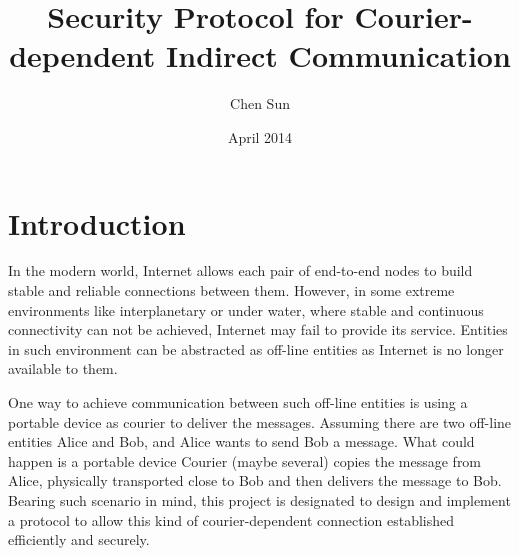 \documentclass[11pt,a4paper]{article}
\begin{document}
\title{Security Protocol for Courier-dependent Indirect Communication}
\author{Chen Sun}
\date{April 2014}
\maketitle

\section{Introduction}
In the modern world, Internet allows each pair of end-to-end nodes to build stable and reliable connections between them. However, in some extreme environments like interplanetary or under water, where stable and continuous connectivity can not be achieved, Internet may fail to provide its service. Entities in such environment can be abstracted as off-line entities as Internet is no longer available to them. \par 
One way to achieve communication between such off-line entities is using a portable device as courier to deliver the messages. Assuming there are two off-line entities Alice and Bob, and Alice wants to send Bob a message. What could happen is a portable device Courier (maybe several) copies the message from Alice, physically transported close to Bob and then delivers the message to Bob. Bearing such scenario in mind, this project is designated to design and implement a protocol to allow this kind of courier-dependent connection established efficiently and securely.\par 
\end{document}
